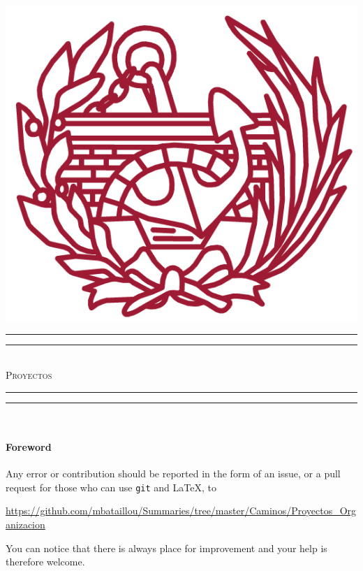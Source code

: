 \begin{titlepage}
\begin{center}


\includegraphics[scale=0.15]{./img/logo_camins.jpg} \\[1cm]



\vfill
\rule{\textwidth}{1.6pt}\vspace*{-\baselineskip}\vspace*{2pt} %
\rule{\textwidth}{0.4pt}\\[\baselineskip] %
{ \huge \textsc{Proyectos} \\[0.4cm] }
\rule{\textwidth}{0.4pt}\vspace*{-\baselineskip}\vspace{3.2pt} %
\rule{\textwidth}{1.6pt}\\[1cm] %

\vfill
\paragraph{Foreword}
Any error or contribution should be reported
in the form of an issue, or a pull request for those
who can use \texttt{git} and \LaTeX, to
\begin{center}
  \url{https://github.com/mbataillou/Summaries/tree/master/Caminos/Proyectos_Organizacion}
\end{center}
You can notice that there is always place for improvement
and your help is therefore welcome.
\vspace{\baselineskip}
\vfill


\end{center}
\end{titlepage}
